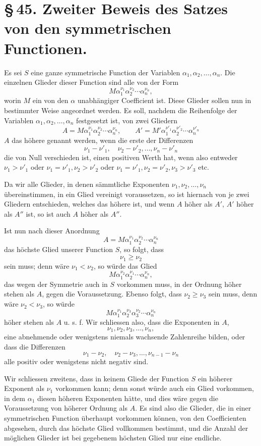 \documentclass[11pt]{article}
\begin{document}
\section*{\S\,45. Zweiter Beweis des Satzes von den symmetrischen Functionen.}

Es sei \(S\) eine ganze symmetrische Function der Variablen \(\alpha_1,\alpha_2,\ldots,\alpha_n\). Die einzelnen Glieder dieser Function sind alle von der Form
\[
 M\alpha_1^{\nu_1}\alpha_2^{\nu_2}\cdots\alpha_n^{\nu_n},
\]
worin \(M\) ein von den \(\alpha\) unabhängiger Coefficient ist. Diese Glieder sollen nun in bestimmter Weise angeordnet werden. Es soll, nachdem die Reihenfolge der Variablen \(\alpha_1,\alpha_2,\ldots,\alpha_n\) festgesetzt ist, von zwei Gliedern
\[
 A=M\alpha_1^{\nu_1}\alpha_2^{\nu_2}\cdots\alpha_n^{\nu_n},\qquad
 A'=M'\alpha_1^{\nu'_1}\alpha_2^{\nu'_2}\cdots\alpha_n^{\nu'_n}
\]
\(A\) das höhere genannt werden, wenn die erste der Differenzen
\[
 \nu_1-\nu'_1,\quad \nu_2-\nu'_2,\ldots,\nu_n-\nu'_n
\]
die von Null verschieden ist, einen positiven Werth hat, wenn also entweder \(\nu_1>\nu'_1\) oder \(\nu_1=\nu'_1,\nu_2>\nu'_2\) oder \(\nu_1=\nu'_1,\nu_2=\nu'_2,\nu_3>\nu'_3\) etc.

Da wir alle Glieder, in denen sämmtliche Exponenten \(\nu_1,\nu_2,\ldots,\nu_n\) übereinstimmen, in ein Glied vereinigt voraussetzen, so ist hiernach von je zwei Gliedern entschieden, welches das höhere ist, und wenn \(A\) höher als \(A'\), \(A'\) höher als \(A''\) ist, so ist auch \(A\) höher als \(A''\).

Ist nun nach dieser Anordnung
\[
 A=M\alpha_1^{\nu_1}\alpha_2^{\nu_2}\cdots\alpha_n^{\nu_n}
\]
das höchste Glied unserer Function \(S\), so folgt, dass
\[
 \nu_1\ge\nu_2
\]
sein muss; denn wäre \(\nu_1<\nu_2\), so würde das Glied
\[
 M\alpha_1^{\nu_2}\alpha_2^{\nu_1}\cdots\alpha_n^{\nu_n},
\]
das wegen der Symmetrie auch in \(S\) vorkommen muss, in der Ordnung höher stehen als \(A\), gegen die Voraussetzung. Ebenso folgt, dass \(\nu_2\ge\nu_3\) sein muss, denn wäre \(\nu_2<\nu_3\), so würde
\[
 M\alpha_1^{\nu_1}\alpha_2^{\nu_3}\alpha_3^{\nu_2}\cdots\alpha_n^{\nu_n}
\]
höher stehen als \(A\) u. s. f. Wir schliessen also, dass die Exponenten in \(A\),
\[
 \nu_1,\nu_2,\nu_3,\ldots,\nu_n,
\]
eine abnehmende oder wenigstens niemals wachsende Zahlenreihe bilden, oder dass die Differenzen
\[
 \nu_1-\nu_2,\quad \nu_2-\nu_3,\ldots,\nu_{n-1}-\nu_n
\]
alle positiv oder wenigstens nicht negativ sind.

Wir schliessen zweitens, dass in keinem Gliede der Function \(S\) ein höherer Exponent als \(\nu_1\) vorkommen kann; denn sonst würde auch ein Glied vorkommen, in dem \(\alpha_1\) diesen höheren Exponenten hätte, und dies wäre gegen die Voraussetzung von höherer Ordnung als \(A\). Es sind also die Glieder, die in einer symmetrischen Function überhaupt vorkommen können, von den Coefficienten abgesehen, durch das höchste Glied vollkommen bestimmt, und die Anzahl der möglichen Glieder ist bei gegebenem höchsten Glied nur eine endliche.
\end{document}

